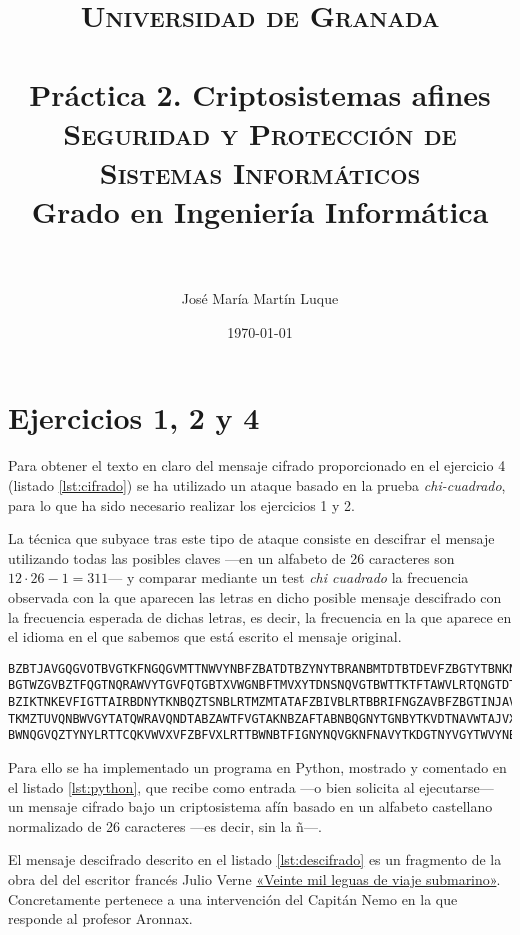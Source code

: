 \documentclass[
  a4paper,
  spanish,
  12pt,
]{scrartcl}
\title{	
\normalfont \normalsize 
\textsc{Universidad de Granada}\\ [25pt] %
\horrule{0.5pt} \\[0.4cm] %
{\sffamily\bfseries\Large Práctica 2. Criptosistemas afines} \\[6pt] %
\textsf{\textsc{Seguridad y Protección de Sistemas Informáticos} \\Grado en Ingeniería Informática}\\
\horrule{2pt} \\ %
}
\author{José María Martín Luque} %
\date{\normalsize\today} %
\begin{document}
\maketitle %

\section*{Ejercicios 1, 2 y 4}

Para obtener el texto en claro del mensaje cifrado proporcionado en el ejercicio 4 (listado  \ref{lst:cifrado}) se ha utilizado un ataque basado en la prueba \textit{chi-cuadrado}, para lo que ha sido necesario realizar los ejercicios 1 y 2. 

La técnica que subyace tras este tipo de ataque consiste en descifrar el mensaje utilizando todas las posibles claves —en un alfabeto de 26 caracteres son $12\cdot 26 - 1 = 311$— y comparar mediante un test \textit{chi cuadrado} la frecuencia observada con la que aparecen las letras en dicho posible mensaje descifrado con la frecuencia esperada de dichas letras, es decir, la frecuencia en la que aparece en el idioma en el que sabemos que está escrito el mensaje original.

\begin{lstlisting}[caption={Mensaje cifrado}, label={lst:cifrado}, breaklines=true]
BZBTJAVGQGVOTBVGTKFNGQGVMTTNWVYNBFZBATDTBZYNYTBRANBMTDTBTDEVFZBGTYTBNKNGNBWGNXKN
BGTWZGVBZTFQGTNQRAWVYTGVFQTGBTXVWGNBFTMVXYTDNSNQVGTBWTTKTFTAWVLRTQNGTDTBTGZANDDT
BZIKTNKEVFIGTTAIRBDNYTKNBQZTSNBLRTMZMTATAFZBIVBLRTBBRIFNGZAVBFZBGTINJAVBDVFVKVBY
TKMZTUVQNBWVGYTATQWRAVQNDTABZAWTFVGTAKNBZAFTABNBQGNYTGNBYTKVDTNAVWTAJVXVNEZRANMN
BWNQGVQZTYNYLRTTCQKVWVXVFZBFVXLRTTBWNBTFIGNYNQVGKNFNAVYTKDGTNYVGYTWVYNBKNBDVBNB
\end{lstlisting}

Para ello se ha implementado un programa en Python, mostrado y comentado en el listado \ref{lst:python}, que recibe como entrada —o bien solicita al ejecutarse— un mensaje cifrado bajo un criptosistema afín basado en un alfabeto castellano normalizado de 26 caracteres —es decir, sin la ñ—. 

El mensaje descifrado descrito en el listado \ref{lst:descifrado} es un fragmento de la obra del del escritor francés Julio Verne \href{https://es.wikisource.org/wiki/Veinte_mil_leguas_de_viaje_submarino:_Primera_parte:_Cap%C3%ADtulo_X}{«Veinte mil leguas de viaje submarino»}. Concretamente pertenece a una intervención del Capitán Nemo en la que responde al profesor Aronnax.
\end{document}
